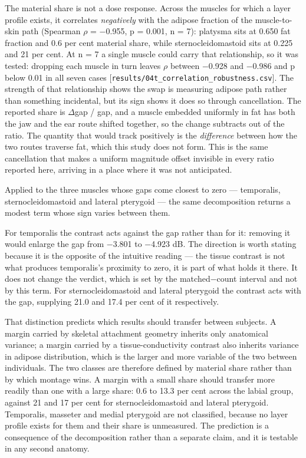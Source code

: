 \documentclass[
  11pt,
]{article}
\begin{document}
The material share is not a dose response. Across the muscles for which a
layer profile exists, it correlates \emph{negatively} with the adipose fraction of
the muscle-to-skin path (Spearman \(\rho\) = −0.955, p = 0.001, n = 7): platysma sits
at 0.650 fat fraction and 0.6 per cent material share, while
sternocleidomastoid sits at 0.225 and 21 per cent. At n = 7 a single muscle could
carry that relationship, so it was tested: dropping each muscle in turn leaves
\(\rho\) between −0.928 and −0.986 and p below 0.01 in all seven cases
{[}\texttt{results/04t\_correlation\_robustness.csv}{]}. The strength of that
relationship shows the swap is measuring adipose path rather than something
incidental, but its sign shows it does so through cancellation. The reported
share is \textbar{}\(\Delta\)gap\textbar{} / \textbar gap\textbar, and a muscle embedded uniformly in fat has both the
jaw and the ear route shifted together, so the change subtracts out of the
ratio. The quantity that would track positively is the \emph{difference} between
how the two routes traverse fat, which this study does not form. This is the
same cancellation that makes a uniform magnitude offset invisible in every
ratio reported here, arriving in a place where it was not anticipated.

Applied to the three muscles whose gaps come closest to zero --- temporalis,
sternocleidomastoid and lateral pterygoid --- the same decomposition returns a
modest term whose sign varies between them.

For temporalis the contrast acts against the gap rather than for it: removing it
would enlarge the gap from −3.801 to −4.923 dB. The direction is worth stating
because it is the opposite of the intuitive reading --- the tissue contrast is not
what produces temporalis's proximity to zero, it is part of what holds it there.
It does not change the verdict, which is set by the matched−count interval and
not by this term. For sternocleidomastoid and lateral pterygoid the contrast acts
with the gap, supplying 21.0 and 17.4 per cent of it respectively.

That distinction predicts which results should transfer between subjects. A
margin carried by skeletal attachment geometry inherits only anatomical variance;
a margin carried by a tissue-conductivity contrast also inherits variance in
adipose distribution, which is the larger and more variable of the two between
individuals. The two classes are therefore defined by material share rather than
by which montage wins. A margin with a small share should transfer more readily
than one with a large share: 0.6 to 13.3 per cent across the labial group,
against 21 and 17 per cent for sternocleidomastoid and lateral pterygoid.
Temporalis, masseter and medial pterygoid are not classified, because no layer
profile exists for them and their share is unmeasured. The
prediction is a consequence of the decomposition rather than a separate claim,
and it is testable in any second anatomy.
\end{document}
